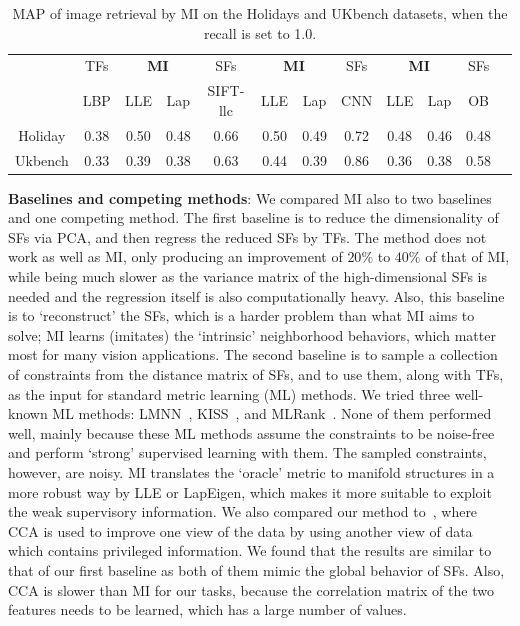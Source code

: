 
\begin{table}[!tb]
  \centering \small \setlength{\tabcolsep}{.60em} 
\caption{MAP of image retrieval by MI on the Holidays and UKbench datasets, when the recall is set to 1.0.}
      \begin{tabular}{c|c|ccc|ccc|cccc}
   & TFs & \multicolumn{2}{c}{\textbf{MI}} & SFs & \multicolumn{2}{c}{ \textbf{MI} } & SFs & \multicolumn{2}{c}{ \textbf{MI}} & SFs  \\   
    & LBP & LLE & Lap & SIFT-llc  & LLE & Lap & CNN &  LLE & Lap & OB     \\   \hline  
    Holiday & 0.38  & 0.50  & 0.48  & 0.66   & 0.50  & 0.49  & 0.72  & 0.48  & 0.46  & 0.48 \\
    Ukbench & 0.33  & 0.39  & 0.38  & 0.63   & 0.44  & 0.39  & 0.86  & 0.36  & 0.38  & 0.58\\   
   \end{tabular}
    \label{tab:retrieval} 
\end{table}
 

\textbf{Baselines and competing methods}: We compared MI also to two
baselines and one competing method. The first baseline is to reduce
the dimensionality of SFs via PCA, and then regress the reduced SFs by
TFs. The method does not work as well as MI, only producing
an improvement of $20\%$ to $40\%$ of that of MI, while being much slower
as the variance matrix of the high-dimensional SFs is needed and the
regression itself is also computationally heavy. Also, this baseline is
to `reconstruct' the SFs, which is a harder problem than what MI aims to solve; 
MI learns (imitates) the `intrinsic' neighborhood behaviors, which matter most for many vision applications. The
second baseline is to sample a collection of constraints from the
distance matrix of SFs, and to use them, along with TFs, as the input
for standard metric learning (ML) methods. We tried three well-known
ML methods: LMNN~\citep{max:margin:knn},
KISS~\citep{large:scale:metric:cvpr12}, and
MLRank~\citep{mlrank:10}. None of them performed well, mainly
because these ML methods assume the constraints to be noise-free and
perform `strong' supervised learning with them. The sampled
constraints, however, are noisy. MI translates the `oracle' metric to
manifold structures in a more robust way by LLE or LapEigen, which
makes it more suitable to exploit the weak supervisory information.
We also compared our method to~\citep{IQ:cvpr11}, where CCA
is used to improve one view of the data by using another view of data
which contains privileged information. We found that the results are
similar to that of our first baseline as both of them mimic the global
behavior of SFs. Also, CCA is slower than MI for our tasks, because the correlation
matrix of the two features needs to be learned, which has a large
number of values.

